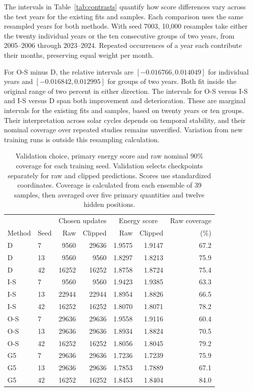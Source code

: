 \documentclass{article}
\begin{document}
The intervals in Table~\ref{tab:contrasts} quantify how score differences vary across the test years for the existing fits and samples. Each comparison uses the same resampled years for both methods. With seed 7003, 10{,}000 resamples take either the twenty individual years or the ten consecutive groups of two years, from 2005--2006 through 2023--2024. Repeated occurrences of a year each contribute their months, preserving equal weight per month.

For O-S minus D, the relative intervals are $[-0.016766,0.014049]$ for individual years and $[-0.016842,0.012995]$ for groups of two years. Both fit inside the original range of two percent in either direction. The intervals for O-S versus I-S and I-S versus D span both improvement and deterioration. These are marginal intervals for the existing fits and samples, based on twenty years or ten groups. Their interpretation across solar cycles depends on temporal stability, and their nominal coverage over repeated studies remains unverified. Variation from new training runs is outside this resampling calculation.

\begin{table}[ht]
\centering
\caption{Validation choice, primary energy score and raw nominal 90\% coverage for each training seed. Validation selects checkpoints separately for raw and clipped predictions. Scores use standardized coordinates. Coverage is calculated from each ensemble of 39 samples, then averaged over five primary quantities and twelve hidden positions.}
\label{tab:seeds}
\begin{tabular}{llrrrrr}
\toprule
 & & \multicolumn{2}{c}{Chosen updates} & \multicolumn{2}{c}{Energy score} & Raw coverage \\
Method & Seed & Raw & Clipped & Raw & Clipped & (\%) \\
\midrule
D & 7 & 9560 & 29636 & 1.9575 & 1.9147 & 67.2 \\
D & 13 & 9560 & 9560 & 1.8297 & 1.8213 & 75.9 \\
D & 42 & 16252 & 16252 & 1.8758 & 1.8724 & 75.4 \\
I-S & 7 & 9560 & 9560 & 1.9423 & 1.9385 & 63.3 \\
I-S & 13 & 22944 & 22944 & 1.8954 & 1.8826 & 66.5 \\
I-S & 42 & 16252 & 16252 & 1.8070 & 1.8071 & 78.2 \\
O-S & 7 & 29636 & 29636 & 1.9558 & 1.9116 & 60.4 \\
O-S & 13 & 29636 & 29636 & 1.8934 & 1.8824 & 70.5 \\
O-S & 42 & 16252 & 16252 & 1.8056 & 1.8045 & 79.2 \\
G5 & 7 & 29636 & 29636 & 1.7236 & 1.7239 & 75.9 \\
G5 & 13 & 29636 & 29636 & 1.7853 & 1.7889 & 67.1 \\
G5 & 42 & 16252 & 16252 & 1.8453 & 1.8404 & 84.0 \\
\bottomrule
\end{tabular}
\end{table}
\end{document}
